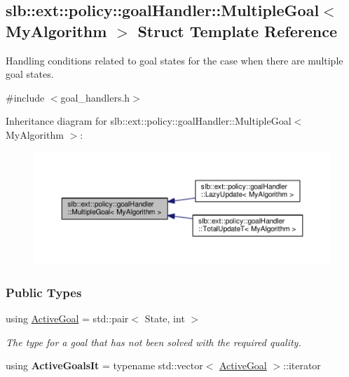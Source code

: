 \hypertarget{structslb_1_1ext_1_1policy_1_1goalHandler_1_1MultipleGoal}{}\subsection{slb\+:\+:ext\+:\+:policy\+:\+:goal\+Handler\+:\+:Multiple\+Goal$<$ My\+Algorithm $>$ Struct Template Reference}
\label{structslb_1_1ext_1_1policy_1_1goalHandler_1_1MultipleGoal}


Handling conditions related to goal states for the case when there are multiple goal states.  




{\ttfamily \#include $<$goal\+\_\+handlers.\+h$>$}



Inheritance diagram for slb\+:\+:ext\+:\+:policy\+:\+:goal\+Handler\+:\+:Multiple\+Goal$<$ My\+Algorithm $>$\+:\nopagebreak
\begin{figure}[H]
\begin{center}
\leavevmode
\includegraphics[width=350pt]{structslb_1_1ext_1_1policy_1_1goalHandler_1_1MultipleGoal__inherit__graph}
\end{center}
\end{figure}
\subsubsection*{Public Types}
\begin{DoxyCompactItemize}
\item 
using \hyperlink{structslb_1_1ext_1_1policy_1_1goalHandler_1_1MultipleGoal_ab5c8ba5693e69007544a7e9e4a48f7fa}{Active\+Goal} = std\+::pair$<$ State, int $>$\hypertarget{structslb_1_1ext_1_1policy_1_1goalHandler_1_1MultipleGoal_ab5c8ba5693e69007544a7e9e4a48f7fa}{}\label{structslb_1_1ext_1_1policy_1_1goalHandler_1_1MultipleGoal_ab5c8ba5693e69007544a7e9e4a48f7fa}

\begin{DoxyCompactList}\small\item\em The type for a goal that has not been solved with the required quality. \end{DoxyCompactList}\item 
using {\bfseries Active\+Goals\+It} = typename std\+::vector$<$ \hyperlink{structslb_1_1ext_1_1policy_1_1goalHandler_1_1MultipleGoal_ab5c8ba5693e69007544a7e9e4a48f7fa}{Active\+Goal} $>$\+::iterator\hypertarget{structslb_1_1ext_1_1policy_1_1goalHandler_1_1MultipleGoal_a6cbdf80decb53458becf058bbaae6971}{}\label{structslb_1_1ext_1_1policy_1_1goalHandler_1_1MultipleGoal_a6cbdf80decb53458becf058bbaae6971}

\end{DoxyCompactItemize}

